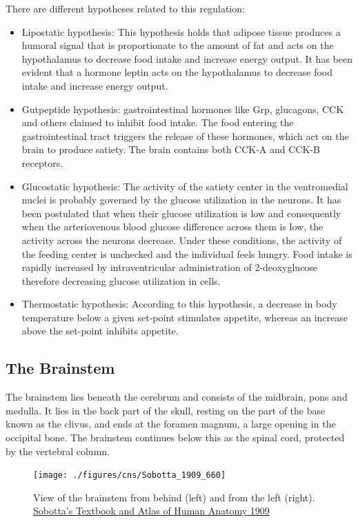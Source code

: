 There are different hypotheses related to this regulation:

\begin{itemize}
\tightlist
\item
  Lipostatic hypothesis: This hypothesis holds that adipose tissue produces a humoral signal that is proportionate to the amount of fat and acts on the hypothalamus to decrease food intake and increase energy output. It has been evident that a hormone leptin acts on the hypothalamus to decrease food intake and increase energy output.
\item
  Gutpeptide hypothesis: gastrointestinal hormones like Grp, glucagons, CCK and others claimed to inhibit food intake. The food entering the gastrointestinal tract triggers the release of these hormones, which act on the brain to produce satiety. The brain contains both CCK-A and CCK-B receptors.
\item
  Glucostatic hypothesis: The activity of the satiety center in the ventromedial nuclei is probably governed by the glucose utilization in the neurons. It has been postulated that when their glucose utilization is low and consequently when the arteriovenous blood glucose difference across them is low, the activity across the neurons decrease. Under these conditions, the activity of the feeding center is unchecked and the individual feels hungry. Food intake is rapidly increased by intraventricular administration of 2-deoxyglucose therefore decreasing glucose utilization in cells.
\item
  Thermostatic hypothesis: According to this hypothesis, a decrease in body temperature below a given set-point stimulates appetite, whereas an increase above the set-point inhibits appetite.
\end{itemize}

\hypertarget{the-brainstem}{%
\subsection{The Brainstem}\label{the-brainstem}}

The brainstem lies beneath the cerebrum and consists of the midbrain, pons and medulla. It lies in the back part of the skull, resting on the part of the base known as the clivus, and ends at the foramen magnum, a large opening in the occipital bone. The brainstem continues below this as the spinal cord, protected by the vertebral column.



\begin{figure}

{\centering \texttt{[image: ./figures/cns/Sobotta\_1909\_660]} 

}

\caption{View of the brainstem from behind (left) and from the left (right). \href{https://commons.wikimedia.org/wiki/File:Sobo_1909_660.png}{Sobotta's Textbook and Atlas of Human Anatomy 1909}}\label{fig:quadrigemina}
\end{figure}

